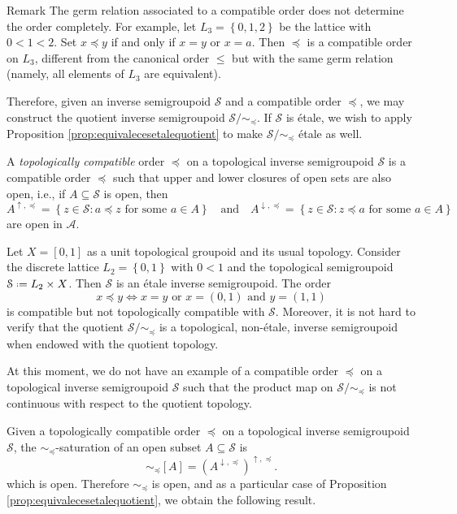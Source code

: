 \begin{denv*}{Remark}
The germ relation associated to a compatible order does not determine the order completely. For example, let $L_3=\left\{0,1,2\right\}$ be the lattice with $0<1<2$. Set $x\preceq y$ if and only if $x=y$ or $x=a$. Then $\preceq$ is a compatible order on $L_3$, different from the canonical order $\leq$ but with the same germ relation (namely, all elements of $L_3$ are equivalent).
\end{denv*}

Therefore, given an inverse semigroupoid $\mathcal{S}$ and a compatible order $\preceq$, we may construct the quotient inverse semigroupoid $\mathcal{S}/\!\!\sim_{\preceq}$. If $\mathcal{S}$ is étale, we wish to apply Proposition \ref{prop:equivalecesetalequotient} to make $\mathcal{S}/\!\!\sim_{\preceq}$ étale as well.

\begin{definition}
A \emph{topologically compatible} order $\preceq$ on a topological inverse semigroupoid $\mathcal{S}$ is a compatible order $\preceq$ such that upper and lower closures of open sets are also open, i.e., if $A\subseteq\mathcal{S}$ is open, then
\[A^{\uparrow,\preceq}=\left\{z\in\mathcal{S}:a\preceq z\text{ for some }a\in A\right\}\quad\text{and}\quad A^{\downarrow,\preceq}=\left\{z\in\mathcal{S}:z\preceq a\text{ for some }a\in A\right\}\]
are open in $\mathcal{A}$.
\end{definition}

\begin{example}
Let $X=[0,1]$ as a unit topological groupoid and its usual topology. Consider the discrete lattice $L_2=\left\{0,1\right\}$ with $0<1$ and the topological semigroupoid $\mathcal{S}\defeq L_2\times X$. Then $\mathcal{S}$ is an étale inverse semigroupoid. The order
\[x\preceq y\iff x=y\text{ or }x=(0,1)\text{ and }y=(1,1)\]
is compatible but not topologically compatible with $\mathcal{S}$. Moreover, it is not hard to verify that the quotient $\mathcal{S}/\!\!\sim_{\preceq}$ is a topological, non-étale, inverse semigroupoid when endowed with the quotient topology.
\end{example}

At this moment, we do not have an example of a compatible order $\preceq$ on a topological inverse semigroupoid $\mathcal{S}$ such that the product map on $\mathcal{S}/\!\!\sim_{\preceq}$ is not continuous with respect to the quotient topology.

Given a topologically compatible order $\preceq$ on a topological inverse semigroupoid $\mathcal{S}$, the $\sim_{\preceq}$-saturation of an open subset $A\subseteq\mathcal{S}$ is
\[\sim_{\preceq}[A]=(A^{\downarrow,\preceq})^{\uparrow,\preceq}.\]
which is open. Therefore $\sim_{\preceq}$ is open, and as a particular case of Proposition \ref{prop:equivalecesetalequotient}, we obtain the following result.

